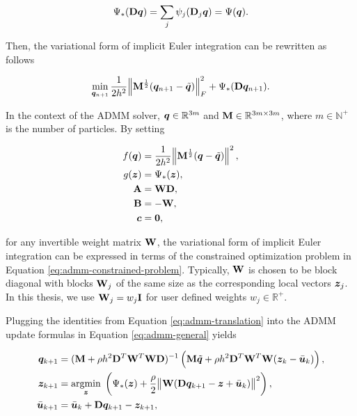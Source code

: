 \[
    \Psi_*(\mathbf{D}\bm{q}) = \sum_j \psi_j (\mathbf{D}_j\bm{q}) = \Psi(\bm{q}).
\]

\noindent Then, the variational form of implicit Euler integration can be rewritten as follows

\begin{equation}\label{eq:variational-admm}
    \min_{\bm{q}_{n+1}} \frac{1}{2h^2} \norm{\mathbf{M}^{\frac{1}{2}}(\bm{q}_{n+1} - \tilde{\bm{q}})}^2_F + \Psi_*(\mathbf{D}\bm{q}_{n+1}).
\end{equation}

\noindent In the context of the ADMM solver, $\bm{q} \in \mathbb{R}^{3m}$ and $\mathbf{M} \in \mathbb{R}^{3m \times 3m}$, where $m \in \mathbb{N}^+$ is the 
number of particles. By setting 

\begin{align}\label{eq:admm-translation}
    \begin{split}
        f(\bm{q}) &= \frac{1}{2h^2}\norm{\mathbf{M}^{\frac{1}{2}}(\bm{q} - \tilde{\bm{q}})}^2, \\
        g(\bm{z}) &= \Psi_*(\bm{z}), \\ 
        \mathbf{A} &= \mathbf{W}\mathbf{D}, \\ 
        \mathbf{B} &= -\mathbf{W}, \\
        \bm{c} &= \bm{0},
    \end{split}
\end{align}

\noindent for any invertible weight matrix $\mathbf{W}$, the variational form of implicit Euler integration can be expressed in terms of the constrained optimization problem 
in Equation \ref{eq:admm-constrained-problem}. Typically, $\mathbf{W}$ is chosen to be block diagonal with blocks $\mathbf{W}_j$ of the same size as the corresponding local 
vectors $\bm{z}_j$. In this thesis, we use $\mathbf{W}_j = w_j \mathbf{I}$ for user defined weights $w_j \in \mathbb{R}^+$.

Plugging the identities from Equation \ref{eq:admm-translation} into the ADMM update formulas in Equation \ref{eq:admm-general} yields 

\begin{align}\label{eq:admm-solver}
    \bm{q}_{k+1} &= (\mathbf{M} + \rho h^2 \mathbf{D}^T\mathbf{W}^T\mathbf{W}\mathbf{D})^{-1} 
    \left( \mathbf{M}\tilde{\bm{q}} + \rho h^2 \mathbf{D}^T\mathbf{W}^T\mathbf{W}(\bm{z}_k - \bar{\bm{u}}_k) \right), \label{eq:admm-q-update} \\
    \bm{z}_{k+1} &= \underset{\bm{z}}{\operatorname{argmin}}\; \left( \Psi_*(\bm{z}) + \frac{\rho}{2}\norm{\mathbf{W}(\mathbf{D}\bm{q}_{k+1} - \bm{z} + \bar{\bm{u}}_k)}^2 \right), \\
    \bar{\bm{u}}_{k+1} &= \bar{\bm{u}}_k + \mathbf{D}{\bm{q}}_{k+1} - \bm{z}_{k+1},
\end{align}

